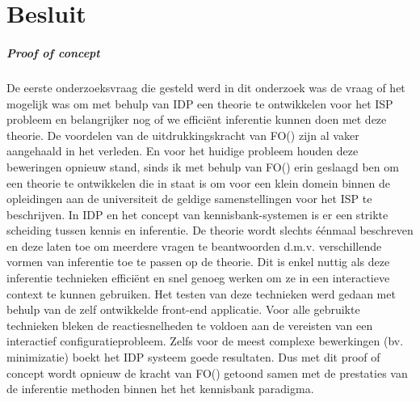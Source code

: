 \chapter{Besluit}
\label{cha:besluit}
\paragraph{Proof of concept}
De eerste onderzoeksvraag die gesteld werd in dit onderzoek was de vraag of het mogelijk was om met behulp van IDP een theorie te ontwikkelen voor het ISP probleem en belangrijker nog of we effici\"{e}nt inferentie kunnen doen met deze theorie. De voordelen van de uitdrukkingskracht van FO(\textperiodcentered) zijn al vaker aangehaald \cite{van2016kb} \cite{de2014predicate} in het verleden. En voor het huidige probleem houden deze beweringen opnieuw stand, sinds ik met behulp van FO(\textperiodcentered) erin geslaagd ben om een theorie te ontwikkelen die in staat is om voor een klein domein binnen de opleidingen aan de universiteit de geldige samenstellingen voor het ISP te beschrijven.
In IDP en het concept van kennisbank-systemen is er een strikte scheiding tussen kennis en inferentie. De theorie wordt slechts \'{e}\'{e}nmaal beschreven en deze laten toe om meerdere vragen te beantwoorden d.m.v. verschillende vormen van inferentie toe te passen op de theorie. Dit is enkel nuttig als deze inferentie technieken effici\"{e}nt en snel genoeg werken om ze in een interactieve context te kunnen gebruiken. Het testen van deze technieken werd gedaan met behulp van de zelf ontwikkelde front-end applicatie. Voor alle gebruikte technieken bleken de reactiesnelheden te voldoen aan de vereisten van een interactief configuratieprobleem. Zelfs voor de meest complexe bewerkingen (bv. minimizatie) boekt het IDP systeem goede resultaten. Dus met dit proof of concept wordt opnieuw de kracht van FO(\textperiodcentered) getoond samen met de prestaties van de inferentie methoden binnen het het kennisbank paradigma.

